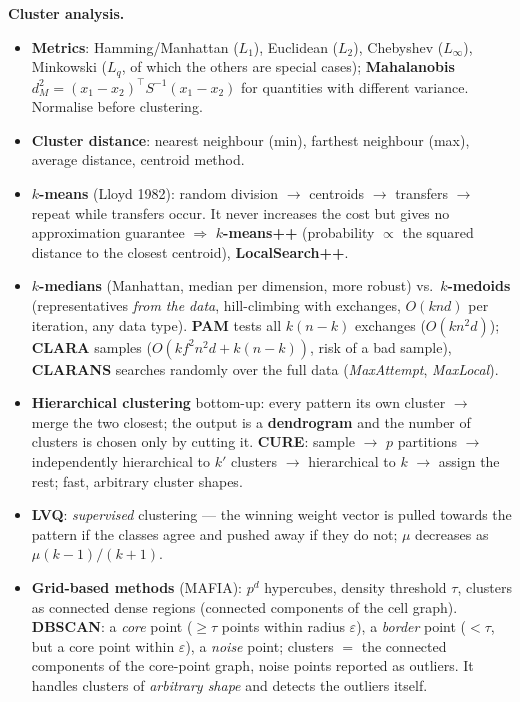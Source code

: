 \documentclass[11pt,a4paper]{article}
\theoremstyle{definition}
\begin{document}
\textbf{Cluster analysis.}
\begin{itemize}
\item \textbf{Metrics}: Hamming/Manhattan ($L_1$), Euclidean ($L_2$), Chebyshev ($L_\infty$),
      Minkowski ($L_q$, of which the others are special cases); \textbf{Mahalanobis}
      $d_M^2=(x_1-x_2)^{\!\top}S^{-1}(x_1-x_2)$ for quantities with different variance. Normalise
      before clustering.
\item \textbf{Cluster distance}: nearest neighbour (min), farthest neighbour (max), average
      distance, centroid method.
\item \textbf{$k$-means} (Lloyd 1982): random division $\to$ centroids $\to$ transfers $\to$ repeat
      while transfers occur. It never increases the cost but gives no approximation guarantee
      $\Rightarrow$ \textbf{$k$-means++} (probability $\propto$ the squared distance to the closest
      centroid), \textbf{LocalSearch++}.
\item \textbf{$k$-medians} (Manhattan, median per dimension, more robust) vs.\
      \textbf{$k$-medoids} (representatives \emph{from the data}, hill-climbing with exchanges,
      $O(knd)$ per iteration, any data type). \textbf{PAM} tests all $k(n-k)$ exchanges
      ($O(kn^2d)$); \textbf{CLARA} samples ($O(kf^2n^2d+k(n-k))$, risk of a bad sample),
      \textbf{CLARANS} searches randomly over the full data (\emph{MaxAttempt}, \emph{MaxLocal}).
\item \textbf{Hierarchical clustering} bottom-up: every pattern its own cluster $\to$ merge the two
      closest; the output is a \textbf{dendrogram} and the number of clusters is chosen only by
      cutting it. \textbf{CURE}: sample $\to$ $p$ partitions $\to$ independently hierarchical to
      $k'$ clusters $\to$ hierarchical to $k$ $\to$ assign the rest; fast, arbitrary cluster shapes.
\item \textbf{LVQ}: \emph{supervised} clustering --- the winning weight vector is pulled towards the
      pattern if the classes agree and pushed away if they do not; $\mu$ decreases as
      $\mu(k-1)/(k+1)$.
\item \textbf{Grid-based methods} (MAFIA): $p^d$ hypercubes, density threshold $\tau$, clusters as
      connected dense regions (connected components of the cell graph). \textbf{DBSCAN}: a
      \emph{core} point ($\ge\tau$ points within radius $\varepsilon$), a \emph{border} point
      ($<\tau$, but a core point within $\varepsilon$), a \emph{noise} point; clusters $=$ the
      connected components of the core-point graph, noise points reported as outliers. It handles
      clusters of \emph{arbitrary shape} and detects the outliers itself.
\end{itemize}
\end{document}
